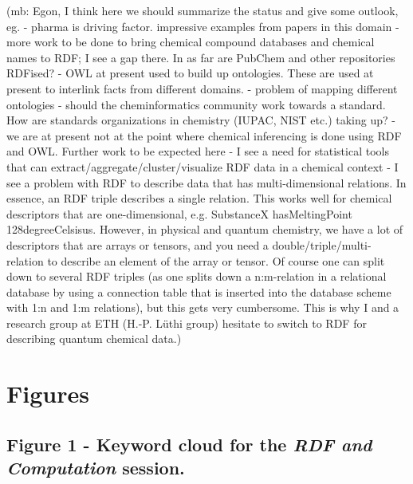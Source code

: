 \documentclass[10pt]{bmc_article}
\newenvironment{bmcformat}{\begin{raggedright}\baselineskip20pt\sloppy\setboolean{publ}{false}}{\end{raggedright}\baselineskip20pt\sloppy}
\begin{document}
\begin{bmcformat}
(mb: Egon, I think here we should summarize the status and give some outlook, eg. 
- pharma is driving factor. impressive examples from papers in this domain
- more work to be done to bring chemical compound databases and chemical names
to RDF; I see a gap there. In as far are PubChem and other repositories RDFised?
- OWL at present used to build up ontologies. These are used at present to
interlink facts from different domains. 
- problem of mapping different ontologies - should the cheminformatics community
work towards a standard. How are standards organizations in chemistry (IUPAC,
NIST etc.) taking up?
- we are at present not at the point where chemical inferencing is done using
RDF and OWL. Further work to be expected here
- I see a need for statistical tools that can
extract/aggregate/cluster/visualize RDF data in a chemical context
- I see a problem with RDF to describe data that has multi-dimensional
relations. In essence, an RDF triple describes a single relation. This works
well for chemical descriptors that are one-dimensional, e.g. SubstanceX
hasMeltingPoint 128degreeCelsisus. However, in physical and quantum chemistry,
we have a lot of descriptors that are arrays or tensors, and you need a
double/triple/multi-relation to describe an element of the array or tensor. Of
course one can split down to several RDF triples (as one splits down a
n:m-relation in a relational database by using a connection table that is
inserted into the database scheme with 1:n and 1:m relations), but this gets
very cumbersome. This is why I and a research group at ETH (H.-P. Lüthi group)
hesitate to switch to RDF for describing quantum chemical data.)






{
   }     %




\section*{Figures}
  \subsection*{Figure 1 - Keyword cloud for the \textit{RDF and Computation} session.}


\end{bmcformat}
\end{document}
